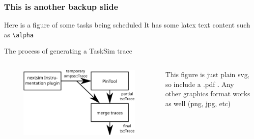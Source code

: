 \documentclass[c,12pt]{beamer}
\begin{document}
\begin{frame}[fragile]
	\frametitle{This is another backup slide}
	\begin{block}{Here is a figure of some tasks being scheduled}
		It has some latex text content such as \verb|\alpha|
		\begin{figure}[h!]
		\centering
		\tiny %
		
		\end{figure}
	\end{block}
	\vspace{-1em}
	\begin{block}{The process of generating a TaskSim trace}
		\begin{columns}
		\begin{column}{0.3\linewidth}
			\begin{figure}[h!]
			\centering
			\includegraphics[width=\linewidth]{tracing_architecture}
			\end{figure}
		\end{column}
		\begin{column}{0.5\linewidth}
			This figure is just plain svg, so include a .pdf . Any other graphics format works as well (png, jpg, etc)
		\end{column}
		\end{columns}
	\end{block}
\end{frame}
\end{document}
